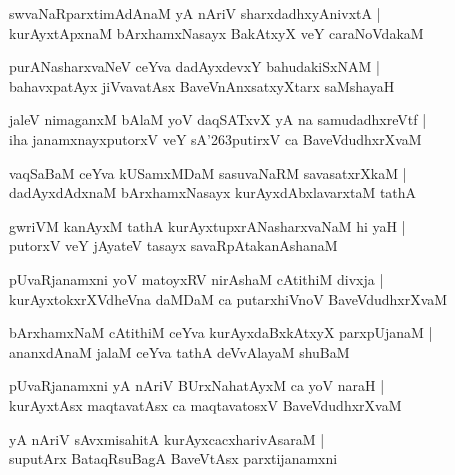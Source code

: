\begin{shloka}
swvaNaRparxtimAdAnaM yA nAriV sharxdadhxyAnivxtA |\\
kurAyxtApxnaM bArxhamxNasayx BakAtxyX veY caraNoVdakaM
\end{shloka}

\begin{shloka}
purANasharxvaNeV ceYva dadAyxdevxY bahudakiSxNAM |\\
bahavxpatAyx jiVvavatAsx BaveVnAnxsatxyXtarx saMshayaH
\end{shloka}

\begin{shloka}
jaleV nimaganxM bAlaM yoV daqSATxvX yA na samudadhxreVtf |\\
iha janamxnayxputorxV veY sA\char'263putirxV ca BaveVdudhxrXvaM
\end{shloka}

\begin{shloka}
vaqSaBaM ceYva kUSamxMDaM sasuvaNaRM savasatxrXkaM |\\
dadAyxdAdxnaM bArxhamxNasayx kurAyxdAbxlavarxtaM tathA
\end{shloka}

\begin{shloka}
gwriVM kanAyxM tathA kurAyxtupxrANasharxvaNaM hi yaH |\\
putorxV veY jAyateV tasayx savaRpAtakanAshanaM
\end{shloka}

\begin{shloka}
pUvaRjanamxni yoV matoyxRV nirAshaM cAtithiM divxja |\\
kurAyxtokxrXVdheVna daMDaM ca putarxhiVnoV BaveVdudhxrXvaM 
\end{shloka}

\begin{shloka}
bArxhamxNaM cAtithiM ceYva kurAyxdaBxkAtxyX parxpUjanaM |\\
ananxdAnaM jalaM ceYva tathA deVvAlayaM shuBaM 
\end{shloka}

\begin{shloka}
pUvaRjanamxni yA nAriV BUrxNahatAyxM ca yoV naraH |\\
kurAyxtAsx maqtavatAsx ca maqtavatosxV BaveVdudhxrXvaM
\end{shloka}

\begin{shloka}
yA nAriV sAvxmisahitA kurAyxcacxharivAsaraM |\\
suputArx BataqRsuBagA BaveVtAsx parxtijanamxni
\end{shloka}

